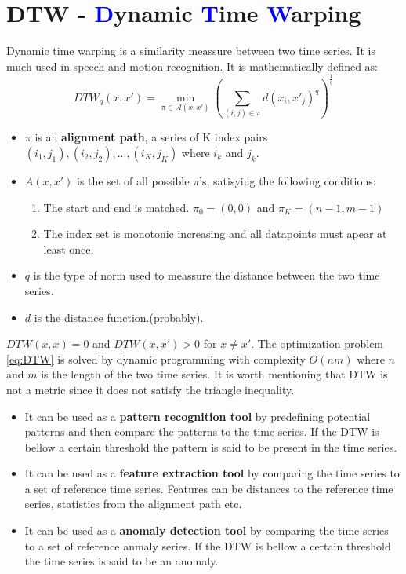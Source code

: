 \section{DTW - \textcolor{blue}{D}ynamic \textcolor{blue}{T}ime \textcolor{blue}{W}arping}
Dynamic time warping is a similarity meassure between two time series. It is much used in speech and motion recognition. It is mathematically defined as:
\begin{equation}
DTW_q(x, x') = \min_{\pi \in \mathcal{A}(x, x')} \left( \sum_{(i,j) \in \pi} d(x_i, x'_j)^q \right)^{\frac{1}{q}}
\label{eq:DTW}
\end{equation}
\begin {itemize}
    \item $\pi$ is an \textbf{alignment path}, a series of K index pairs $(i_1, j_1), (i_2, j_2), ..., (i_K, j_K)$ where $i_k$ and $j_k$.
    \item $A(x, x')$ is the set of all possible $\pi$'s, satisying the following conditions:
    \begin{enumerate}
        \item The start and end is matched. $\pi_0 = (0,0)$ and $\pi_K = (n-1, m-1)$
        \item The index set is monotonic increasing and all datapoints must apear at least once.
    \end{enumerate}
    \item $q$ is the type of norm used to meassure the distance between the two time series.
    \item $d$ is the distance function.(probably).
\end{itemize}
$DTW(x,x) = 0$ and $DTW(x,x') > 0$ for $x \neq x'$. \newline
The optimization problem \ref*{eq:DTW} is solved by dynamic programming with complexity $O(nm)$ where $n$ and $m$ is the length of the two time series. \newline
It is worth mentioning that DTW is not a metric since it does not satisfy the triangle inequality. \newline

\begin{itemize}
    \item It can be used as a \textbf{pattern recognition tool} by predefining potential patterns and then compare the patterns to the time series. If the DTW is bellow a certain threshold the pattern is said to be present in the time series. \newline
    \item It can be used as a \textbf{feature extraction tool} by comparing the time series to a set of reference time series. Features can be distances to the reference time series, statistics from the alignment path etc.
    \item It can be used as a \textbf{anomaly detection tool} by comparing the time series to a set of reference anmaly series. If the DTW is bellow a certain threshold the time series is said to be an anomaly. 
\end{itemize}

